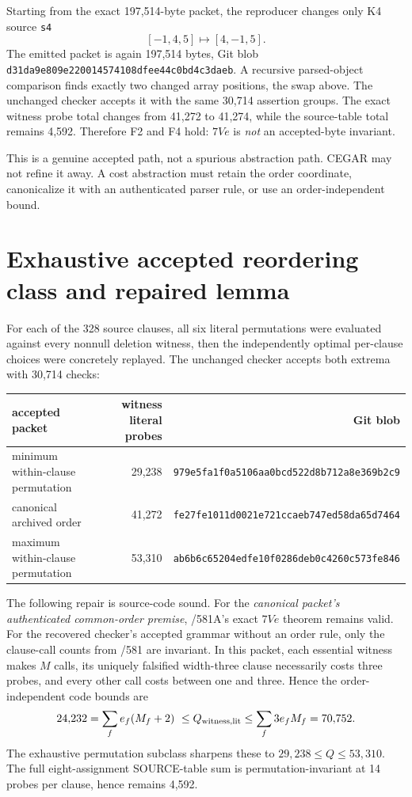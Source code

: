 \documentclass[11pt]{article}
\begin{document}
Starting from the exact 197,514-byte packet, the reproducer changes only K4 source \texttt{s4}
\[
[-1,4,5]\longmapsto[4,-1,5].
\]
The emitted packet is again 197,514 bytes, Git blob \texttt{d31da9e809e220014574108dfee44c0bd4c3daeb}. A recursive parsed-object comparison finds exactly two changed array positions, the swap above. The unchanged checker accepts it with the same 30,714 assertion groups. The exact witness probe total changes from 41,272 to 41,274, while the source-table total remains 4,592. Therefore F2 and F4 hold: $7Ve$ is \emph{not} an accepted-byte invariant.

This is a genuine accepted path, not a spurious abstraction path. CEGAR may not refine it away. A cost abstraction must retain the order coordinate, canonicalize it with an authenticated parser rule, or use an order-independent bound.

\section*{Exhaustive accepted reordering class and repaired lemma}
For each of the 328 source clauses, all six literal permutations were evaluated against every nonnull deletion witness, then the independently optimal per-clause choices were concretely replayed. The unchanged checker accepts both extrema with 30,714 checks:
\begin{center}
\begin{tabular}{lrr}
\toprule
accepted packet & witness literal probes & Git blob\\
\midrule
minimum within-clause permutation & 29,238 & \texttt{979e5fa1f0a5106aa0bcd522d8b712a8e369b2c9}\\
canonical archived order & 41,272 & \texttt{fe27fe1011d0021e721ccaeb747ed58da65d7464}\\
maximum within-clause permutation & 53,310 & \texttt{ab6b6c65204edfe10f0286deb0c4260c573fe846}\\
\bottomrule
\end{tabular}
\end{center}
The following repair is source-code sound. For the \emph{canonical packet's authenticated common-order premise}, /581A's exact $7Ve$ theorem remains valid. For the recovered checker's accepted grammar without an order rule, only the clause-call counts from /581 are invariant. In this packet, each essential witness makes $M$ calls, its uniquely falsified width-three clause necessarily costs three probes, and every other call costs between one and three. Hence the order-independent code bounds are
\[
24{,}232=\sum_f e_f(M_f+2)\ \le Q_{\rm witness,lit}\le\sum_f3e_fM_f=70{,}752.
\]
The exhaustive permutation subclass sharpens these to $29{,}238\le Q\le53{,}310$. The full eight-assignment SOURCE-table sum is permutation-invariant at 14 probes per clause, hence remains 4,592.
\end{document}
